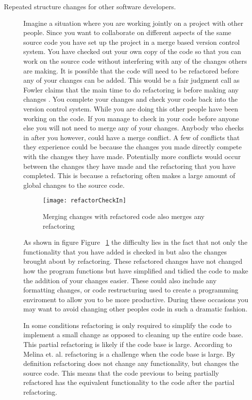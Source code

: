 \begin{description}
\item [Repeated structure changes for other software developers.]
Imagine a situation where you are working jointly on a project with other people. Since you want to collaborate on different aspects of the same source code you have set up the project in a merge based version control system.  You have checked out your own copy of the code so that you can work on the source code without interfering with any of the changes others are making. It is possible that the code will need to be refactored before any of your changes can be added.  This would be a fair judgment call as Fowler claims that the main time to do refactoring is before making any changes \cite{Fowler1999}. You complete your changes and check your code back into the version control system.  While you are doing this other people have been working on the code.  If you manage to check in your code before anyone else you will not need to merge any of your changes.  Anybody who checks in after you however, could have a merge conflict.  A few of conflicts that they experience could be because the changes you made directly compete with the changes they have made. Potentially more conflicts would occur between the changes they have made and the refactoring that you have completed. This is because a refactoring often makes a large amount of global changes to the source code. 

\begin{figure}[!t]
\begin{center}
\texttt{[image: refactorCheckIn]}
\end{center}
\caption{Merging changes with refactored code also merges any refactoring}
\label{fig:motMerge}
\end{figure}

As shown in figure Figure ~\ref{fig:motMerge} the difficulty lies in the fact that not only the functionality that you have added is checked in but also the changes brought about by refactoring.  These refactored changes have not changed how the program functions but have simplified and tidied the code to make the addition of your changes easier. These could also include any formatting changes, or code restructuring used to create a programming enviroment to allow you to be more productive.  During these occasions you may want to avoid changing other peoples code in such a dramatic fashion.

In some conditions refactoring is only required to simplify the code to implement a small change as opposed to cleaning up the entire code base.  This partial refactoring is likely if the code base is large. According to Melina et. al. \cite{Milea2014} refactoring is a challenge when the code base is large. By definition refactoring does not change any functionality, but changes the source code. This means that the code previous to being partially refactored has the equivalent functionality to the code after the partial refactoring.


\end{description}
